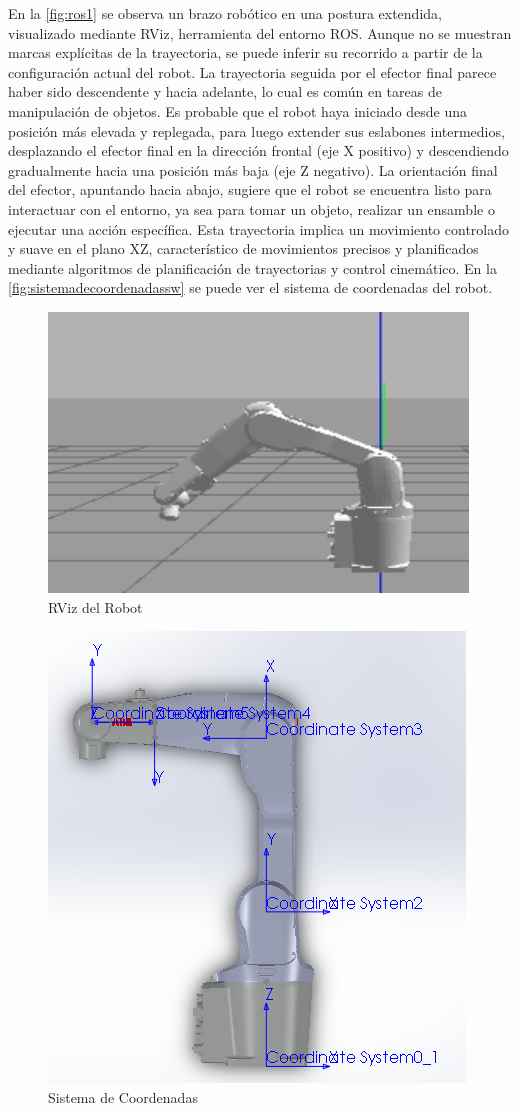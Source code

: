 En la \autoref{fig:ros1}  se observa un brazo robótico en una postura extendida, visualizado mediante RViz, herramienta del entorno ROS. Aunque no se muestran marcas explícitas de la trayectoria, se puede inferir su recorrido a partir de la configuración actual del robot. La trayectoria seguida por el efector final parece haber sido descendente y hacia adelante, lo cual es común en tareas de manipulación de objetos. Es probable que el robot haya iniciado desde una posición más elevada y replegada, para luego extender sus eslabones intermedios, desplazando el efector final en la dirección frontal (eje X positivo) y descendiendo gradualmente hacia una posición más baja (eje Z negativo). La orientación final del efector, apuntando hacia abajo, sugiere que el robot se encuentra listo para interactuar con el entorno, ya sea para tomar un objeto, realizar un ensamble o ejecutar una acción específica. Esta trayectoria implica un movimiento controlado y suave en el plano XZ, característico de movimientos precisos y planificados mediante algoritmos de planificación de trayectorias y control cinemático. En la \autoref{fig:sistemadecoordenadassw} se puede ver el sistema de coordenadas del robot.

\begin{figure}
	\centering
	\includegraphics[width=0.5\linewidth]{img/ROS1}
	\caption{RViz del Robot}
	\label{fig:ros1}
\end{figure}

\begin{figure}
	\centering
	\includegraphics[width=0.3\linewidth]{img/SISTEMADECOORDENADASSW}
	\caption{Sistema de Coordenadas}
	\label{fig:sistemadecoordenadassw}
\end{figure}



